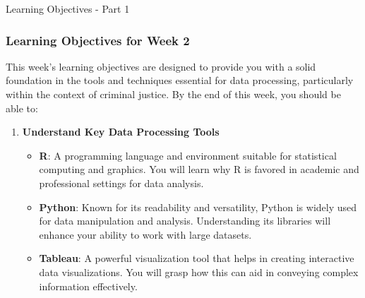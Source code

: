\documentclass[aspectratio=169]{beamer}
\begin{document}
\begin{frame}[fragile]{Learning Objectives - Part 1}
    \frametitle{Learning Objectives for Week 2}

    This week's learning objectives are designed to provide you with a solid foundation in the tools and techniques essential for data processing, particularly within the context of criminal justice. By the end of this week, you should be able to:
    
    \begin{enumerate}
        \item \textbf{Understand Key Data Processing Tools}
            \begin{itemize}
                \item \textbf{R}: A programming language and environment suitable for statistical computing and graphics. You will learn why R is favored in academic and professional settings for data analysis.
                \item \textbf{Python}: Known for its readability and versatility, Python is widely used for data manipulation and analysis. Understanding its libraries will enhance your ability to work with large datasets.
                \item \textbf{Tableau}: A powerful visualization tool that helps in creating interactive data visualizations. You will grasp how this can aid in conveying complex information effectively.
            \end{itemize}
    \end{enumerate}
\end{frame}
\end{document}
